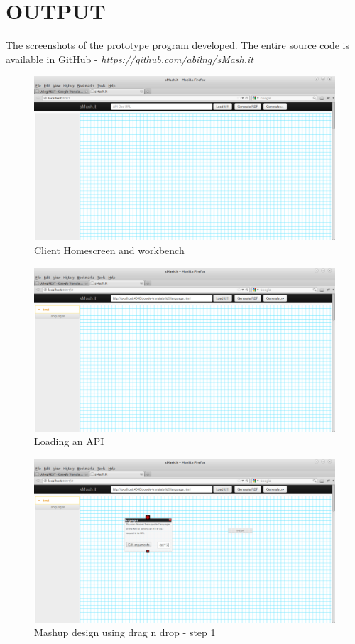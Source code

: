 \chapter{OUTPUT}
\begin{spacing}{1.5}
The screenshots of the prototype program developed. The entire source code is available in GitHub - {\it https://github.com/abilng/sMash.it}

\begin{figure}
        \centering
        \includegraphics[scale=0.3]{images/7.png}
        \caption{Client Homescreen and workbench}
\end{figure}

\begin{figure}
        \centering
        \includegraphics[scale=0.3]{images/6.png}
        \caption{Loading an API}
\end{figure}


\begin{figure}
        \centering
        \includegraphics[scale=0.3]{images/5.png}
        \caption{Mashup design using drag n drop - step 1}
\end{figure}


\end{spacing}

